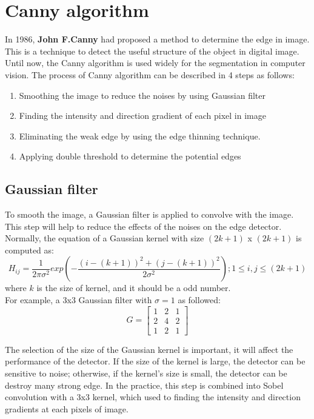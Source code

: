 \section{Canny algorithm}
In 1986, \textbf{John F.Canny} had proposed a method to determine the edge in image. This is a technique to detect the useful structure of the object in digital image. Until now, the Canny algorithm\cite{canny1986computational} is used widely for the segmentation in computer vision. The process of Canny algorithm can be described in 4 steps as follows:
\begin{enumerate}
	\item Smoothing the image to reduce the noises by using Gaussian filter
	\item Finding the intensity and direction gradient of each pixel in image
	\item Eliminating the weak edge by using the edge thinning technique.
	\item Applying double threshold to determine the potential edges
\end{enumerate}
	\subsection{Gaussian filter}
	To smooth the image, a Gaussian filter is applied to convolve with the image. This step will help to reduce the effects of the noises on the edge detector. Normally, the equation of a Gaussian kernel with size $(2k+1)$ x $(2k + 1)$  is computed as:
	\begin{equation}
	H_{ij}=\frac{1}{2\pi\sigma^2}exp(-\frac{(i-(k+1))^2 + (j-(k+1))^2}{2\sigma^2});1\leq i,j \leq (2k+1)
	\end{equation}
	where $k$ is the size of kernel, and it should be a odd number.\\
	For example, a 3x3 Gaussian filter with $\sigma = 1 $ as followed:
	\begin{equation}
		G = 
		\begin{bmatrix}
		1 & 2 & 1\\
		2 & 4 & 2\\
		1 & 2 & 1		
		\end{bmatrix}
	\end{equation}	
	
	The selection of the size of the Gaussian kernel is important, it will affect the performance of the detector. If the size of the kernel is large, the detector can be sensitive to noise; otherwise, if the kernel's size is small, the detector can be destroy many strong edge. In the practice, this step is combined into Sobel convolution with a 3x3 kernel, which used to finding the intensity and direction gradients at each pixels of image.
